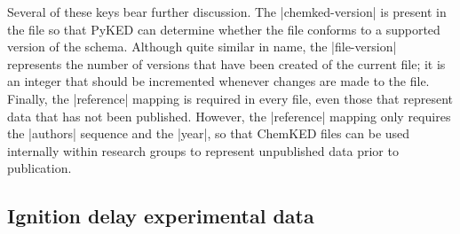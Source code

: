 \documentclass[12pt]{ijck}
\newcommand\ck{ChemKED}
\begin{document}
Several of these keys bear further discussion. The \yabox|chemked-version| is present in the file so
that PyKED can determine whether the file conforms to a supported version of the schema. Although
quite similar in name, the \yabox|file-version| represents the number of versions that have been
created of the current file; it is an integer that should be incremented whenever changes are made
to the file. Finally, the \yabox|reference| mapping is required in every file, even those that
represent data that has not been published. However, the \yabox|reference| mapping only requires the
\yabox|authors| sequence and the \yabox|year|, so that \ck{} files can be used internally within
research groups to represent unpublished data prior to publication.

\subsection{Ignition delay experimental data}
\label{sec:ignition-delay-experimental-data}
\end{document}
